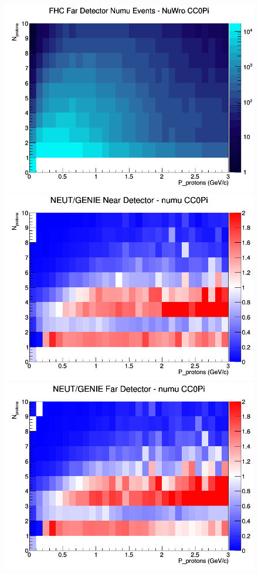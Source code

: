 \documentclass[12pt]{article}
\begin{document}
\begin{figure}[h]
\endminipage
{}
\includegraphics[width=\linewidth]{N_P/nominal/protons/CC0Pi_FHC_FD_numu_N_P_NuWro.png}
\endminipage
\newline
{}
\includegraphics[width=\linewidth]{N_P/nominal/protons/ratios/CC0Pi_NEUT_GENIE_numu_near_N_P.png}
\endminipage
{}
\includegraphics[width=\linewidth]{N_P/nominal/protons/ratios/CC0Pi_NEUT_GENIE_numu_far_N_P.png}

\end{figure}
\end{document}
